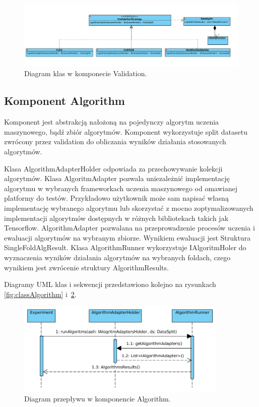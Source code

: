 \documentclass[12pt]{article}
\begin{document}
\begin{figure}[!h]
\centering
	\includegraphics[width=1.0\textwidth]{img/class_diagrams/validation.png}
	\caption{Diagram klas w komponecie Validation.}
	\label{fig:Validation}
\end{figure}
\newpage

\subsection{Komponent Algorithm}

Komponent jest abstrakcją nałożoną na pojedynczy algorytm uczenia maszynowego, bądź zbiór algorytmów. Komponent wykorzystuje split datasetu zwrócony przez validation do obliczania wyników działania stosowanych algorytmów. 
 
Klasa AlgorithmAdapterHolder odpowiada za przechowywanie kolekcji algorytmów. Klasa AlgoritmAdapter pozwala uniezależnić implementację algorytmu w wybranych frameworkach uczenia maszynowego od omawianej platformy do testów. Przykładowo użytkownik może sam napisać własną implementację wybranego algorytmu lub skorzystać z mocno zoptymalizowanych implementacji algorytmów dostępnych w różnych bibliotekach takich jak Tensorflow. AlgorithmAdapter pozwalana na przeprowadzenie procesów uczenia i ewaluacji algorytmów na wybranym zbiorze. Wynikiem ewaluacji jest Struktura SingleFoldAlgResult. Klasa AlgorithmRunner wykorzystuje IAlgoritmHoler do wyznaczenia wyników działania algorytmów na wybranych foldach, czego wynikiem jest zwrócenie struktury AlgorithmResults.

Diagramy UML klas i sekwencji przedstawiono kolejno na rysunkach \ref{fig:classAlgorithm} i~\ref{fig:sequenceAlgorithm}.

\begin{figure}[!h]
	\centering
	\includegraphics[width=0.9\textwidth]{img/sequenceAlgorithm.png}
	\caption{Diagram przepływu w komponencie Algorithm.}
	\label{fig:sequenceAlgorithm}
\end{figure}
\end{document}
